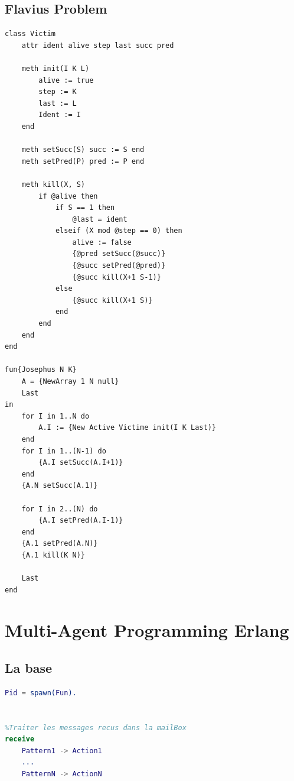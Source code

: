 \documentclass[a4paper,12pt]{scrartcl}
\begin{document}
	\subsection{Flavius Problem}
		\begin{lstlisting}[language=OZ]
class Victim
	attr ident alive step last succ pred
	
	meth init(I K L)
		alive := true
		step := K
		last := L
		Ident := I
	end
	
	meth setSucc(S) succ := S end
	meth setPred(P) pred := P end
	
	meth kill(X, S)
		if @alive then
			if S == 1 then
				@last = ident
			elseif (X mod @step == 0) then
				alive := false
				{@pred setSucc(@succ)}
				{@succ setPred(@pred)}
				{@succ kill(X+1 S-1)}
			else
				{@succ kill(X+1 S)}
			end
		end
	end
end

fun{Josephus N K}
	A = {NewArray 1 N null}
	Last
in 
	for I in 1..N do
		A.I := {New Active Victime init(I K Last)}
	end
	for I in 1..(N-1) do
		{A.I setSucc(A.I+1)}
	end
	{A.N setSucc(A.1)}
	
	for I in 2..(N) do
		{A.I setPred(A.I-1)}
	end
	{A.1 setPred(A.N)}
	{A.1 kill(K N)}
	
	Last
end
		\end{lstlisting}
	
\section{Multi-Agent Programming Erlang}
	\subsection{La base}
		\begin{lstlisting}[language=Erlang]
%Cree un processus
Pid = spawn(Fun).


%Traiter les messages recus dans la mailBox
receive
	Pattern1 -> Action1
	...
	PatternN -> ActionN
		\end{lstlisting}
		
\end{document}
